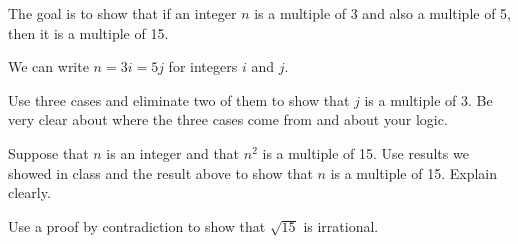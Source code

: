 \yourname


\blist{3.5in}
\item 
The goal is to show that if an integer $n$ is a multiple of 3 and also a multiple of 5, then it is a multiple of 15.

We can write $n=3i=5j$ for integers $i$ and $j$.

Use three cases and eliminate two of them to show that $j$ is a multiple of 3.
Be very clear about where the three cases come from and about your logic.

\item
Suppose that $n$ is an integer and that $n^2$ is a multiple of 15.
Use results we showed in class and the result above to show that $n$ is a multiple of 15.
Explain clearly.



\item Use a proof by contradiction to show that $\sqrt{15}$ is irrational.


\elist
\vfill          %
